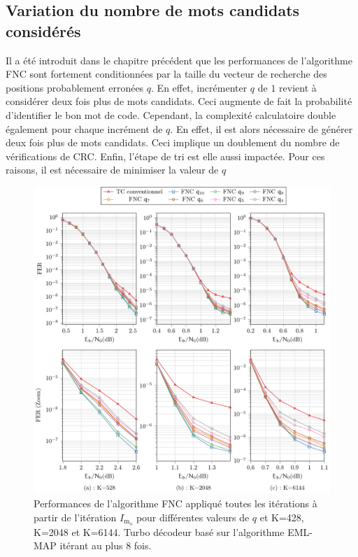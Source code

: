 \subsection{Variation du nombre de mots candidats considérés}
Il a été introduit dans le chapitre précédent que les performances de l'algorithme FNC sont fortement conditionnées
par la taille du vecteur de recherche des positions probablement erronées $q$. En effet, incrémenter $q$ de $1$ revient 
à considérer deux fois plus de mots candidats. Ceci augmente de fait la probabilité d'identifier le bon mot de code. 
Cependant, la complexité calculatoire double également pour chaque incrément de $q$. En effet, il est alors nécessaire
de générer deux fois plus de mots candidats. Ceci implique un doublement du nombre de vérifications de CRC. Enfin,
l'étape de tri est elle aussi impactée. Pour ces raisons, il est nécessaire de minimiser la valeur de $q$

\begin{figure}[!t]
	\hspace*{-.075\textwidth}
	\includegraphics[width=1.1\textwidth]{main/ch4_fig/final/tikz_last/fnc_qX.pdf}
	\caption{Performances de l'algorithme FNC appliqué toutes les itérations à partir de l'itération $I_{\text{m}_\text{o}}$ pour différentes
	valeurs de $q$ et K=428, K=2048 et K=6144.
	Turbo décodeur basé sur l'algorithme EML-MAP itérant au plus 8 fois.
	\label{fig:fnc_q}}
\end{figure}

